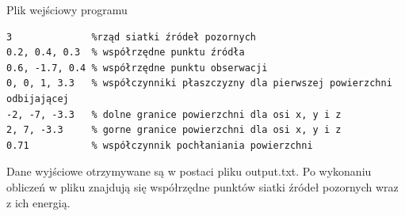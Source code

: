 \begin{program}
\caption{Plik wejściowy programu}
\begin{lstlisting}
3              %rząd siatki źródeł pozornych
0.2, 0.4, 0.3  % współrzędne punktu źródła
0.6, -1.7, 0.4 % współrzędne punktu obserwacji
0, 0, 1, 3.3   % współczynniki płaszczyzny dla pierwszej powierzchni odbijającej 
-2, -7, -3.3   % dolne granice powierzchni dla osi x, y i z 
2, 7, -3.3     % gorne granice powierzchni dla osi x, y i z
0.71           % współczynnik pochłaniania powierzchni
\end{lstlisting}
\end{program}

Dane wyjściowe otrzymywane są w postaci pliku output.txt. Po wykonaniu obliczeń w pliku znajdują się współrzędne punktów siatki źródeł pozornych wraz z ich energią.

